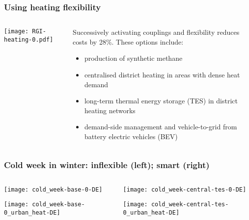 \documentclass[10pt,aspectratio=169,dvipsnames]{beamer}
\let\olditem\item
\renewcommand{\item}{%
\olditem\vspace{5pt}}
\begin{document}
\begin{frame}
  \frametitle{Using heating flexibility}
  \begin{columns}[T]
    \begin{column}{8.3cm}
      \texttt{[image: RGI-heating-0.pdf]}
    \end{column}
    \begin{column}{6cm}

      \vspace{.5cm}
        Successively activating couplings and flexibility \alert{reduces costs} by 28\%.
        These options include:
        \begin{itemize}
          \item  production of \alert{synthetic methane}
          \item  centralised \alert{district heating} in areas with dense heat demand
          \item long-term \alert{thermal energy storage} (TES)  in district heating networks
          \item \alert{demand-side management} and vehicle-to-grid from battery electric vehicles (BEV)
        \end{itemize}
    \end{column}
  \end{columns}
\end{frame}



\begin{frame}
  \frametitle{Cold week in winter: inflexible (left); smart (right)}

  \begin{columns}[T]
    \begin{column}{6.5cm}
  \centering
\texttt{[image: cold\_week-base-0-DE]}

\texttt{[image: cold\_week-base-0\_urban\_heat-DE]}
    \end{column}
    \begin{column}{6.5cm}
  \centering

  \texttt{[image: cold\_week-central-tes-0-DE]}

  \texttt{[image: cold\_week-central-tes-0\_urban\_heat-DE]}
    \end{column}
  \end{columns}
\end{frame}
\end{document}
